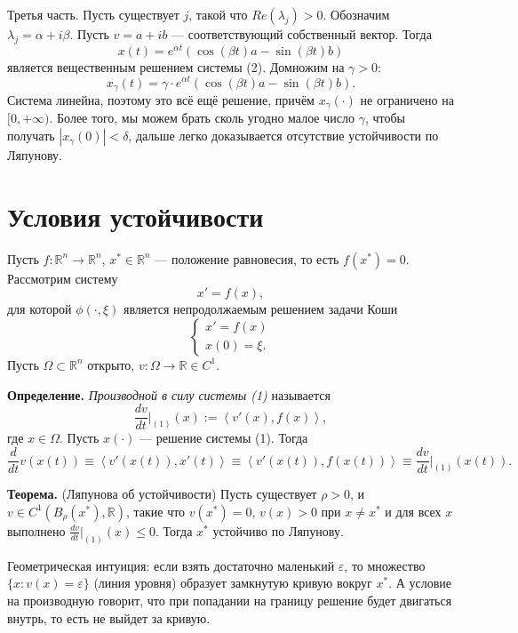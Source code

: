 Третья часть. Пусть существует $j$, такой что $Re(\lambda_j) > 0$.
Обозначим $\lambda_j = \alpha + i \beta$.
Пусть $v = a + ib$ --- соответствующий собственный вектор.
Тогда
\[
    x(t) = e^{\alpha t} (\cos(\beta t) a - \sin(\beta t) b)
\]
является вещественным решением системы (2).
Домножим на $\gamma > 0$:
\[
    x_\gamma(t) = \gamma \cdot e^{\alpha t} (\cos(\beta t) a - \sin(\beta t) b).
\]
Система линейна, поэтому это всё ещё решение, причём $x_\gamma(\cdot)$ не ограничено на $[0, +\infty)$.
Более того, мы можем брать сколь угодно малое число $\gamma$, чтобы получать $|x_\gamma(0)| < \delta$, дальше легко доказывается отсутствие устойчивости по Ляпунову.

\QED

\setcounter{equation}{0}
\section{Условия устойчивости}
Пусть $f: \mathbb R^n \to \mathbb R^n$, $x^* \in \mathbb R^n$ --- положение равновесия, то есть $f(x^*) = 0$.
Рассмотрим систему
\begin{equation}
    x' = f(x),
\end{equation}
для которой $\phi(\cdot, \xi)$ является непродолжаемым решением задачи Коши
\[
    \begin{cases}
        x' = f(x) \\
        x(0) = \xi.
    \end{cases}
\]
Пусть $\Omega \subset \mathbb R^n$ открыто, $v: \Omega \to \mathbb R \in C^1$.

\textbf{Определение.} \textit{Производной в силу системы (1)} называется
\[
    \frac{dv}{dt} \bigg|_{(1)}(x) := \left< v'(x), f(x) \right>,
\]
где $x \in \Omega$.
Пусть $x(\cdot)$ --- решение системы (1). Тогда
\[
    \frac{d}{dt} v(x(t)) \equiv \left< v'(x(t)), x'(t) \right> \equiv \left< v'(x(t)), f(x(t)) \right> \equiv \frac{dv}{dt} \bigg|_{(1)}(x(t)).
\]

\textbf{Теорема.} (Ляпунова об устойчивости) Пусть существует $\rho > 0$, и $v \in C^1(B_{\rho}(x^*), \mathbb R)$, такие что $v(x^*) = 0$, $v(x) > 0$ при $x \ne x^*$ и для всех $x$ выполнено $\frac{dv}{dt} \big|_{(1)} (x) \le 0$.
Тогда $x^*$ устойчиво по Ляпунову.

Геометрическая интуиция: если взять достаточно маленький $\varepsilon$, то множество $\{x: v(x) = \varepsilon \}$ (линия уровня) образует замкнутую кривую вокруг $x^*$.
А условие на производную говорит, что при попадании на границу решение будет двигаться внутрь, то есть не выйдет за кривую.

